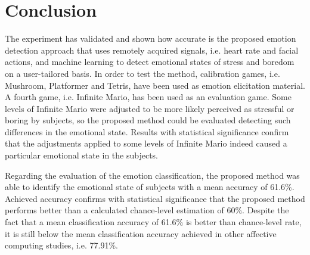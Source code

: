 


\section{Conclusion}

The experiment has validated and shown how accurate is the proposed emotion detection approach that uses remotely acquired signals, i.e. heart rate and facial actions, and machine learning to detect emotional states of stress and boredom on a user-tailored basis. In order to test the method, calibration games, i.e. Mushroom, Platformer and Tetris, have been used as emotion elicitation material. A fourth game, i.e. Infinite Mario, has been used as an evaluation game. Some levels of Infinite Mario were adjusted to be more likely perceived as stressful or boring by subjects, so the proposed method could be evaluated detecting such differences in the emotional state. Results with statistical significance confirm that the adjustments applied to some levels of Infinite Mario indeed caused a particular emotional state in the subjects.

Regarding the evaluation of the emotion classification, the proposed method was able to identify the emotional state of subjects with a mean accuracy of 61.6\%. Achieved accuracy confirms with statistical significance that the proposed method performs better than a calculated chance-level estimation of 60\%. Despite the fact that a mean classification accuracy of 61.6\% is better than chance-level rate, it is still below the mean classification accuracy achieved in other affective computing studies, i.e. 77.91\%.

